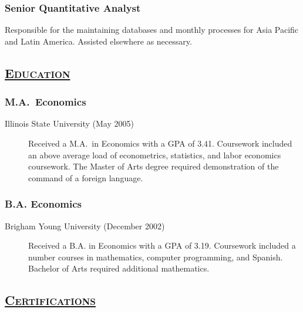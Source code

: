 \documentclass[
  letterpaper,
  DIV=11,
  numbers=noendperiod]{scrartcl}
\begin{document}
\hypertarget{senior-quantitative-analyst}{%
\subsubsection{Senior Quantitative
Analyst}\label{senior-quantitative-analyst}}

Responsible for the maintaining databases and monthly processes for Asia
Pacific and Latin America. Assisted elsewhere as necessary.

\hypertarget{education}{%
\subsection{\texorpdfstring{\textsc{\ul{Education}}}{Education}}\label{education}}

\hypertarget{m.a.-economics}{%
\subsubsection{M.A.~Economics}\label{m.a.-economics}}

\begin{description}
\item[Illinois State University (May 2005)]
Received a M.A.~in Economics with a GPA of 3.41. Coursework included an
above average load of econometrics, statistics, and labor economics
coursework. The Master of Arts degree required demonstration of the
command of a foreign language.
\end{description}

\hypertarget{b.a.-economics}{%
\subsubsection{B.A. Economics}\label{b.a.-economics}}

\begin{description}
\item[Brigham Young University (December 2002)]
Received a B.A. in Economics with a GPA of 3.19. Coursework included a
number courses in mathematics, computer programming, and Spanish.
Bachelor of Arts required additional mathematics.
\end{description}

\hypertarget{certifications}{%
\subsection{\texorpdfstring{\textsc{\ul{Certifications}}}{Certifications}}\label{certifications}}
\end{document}

